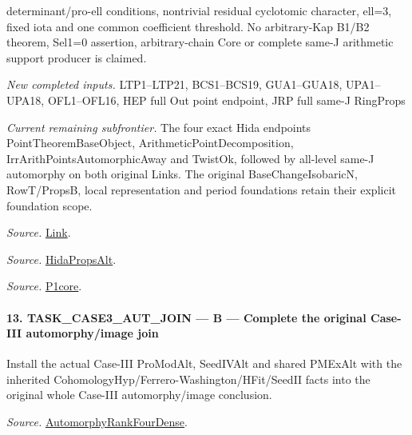 determinant/pro-ell conditions, nontrivial residual cyclotomic character, ell=3, fixed iota and one common coefficient threshold. No arbitrary-Kap B1/B2 theorem, Sel1=0 assertion, arbitrary-chain Core or complete same-J arithmetic support producer is claimed.

\emph{New completed inputs.} LTP1–LTP21, BCS1–BCS19, GUA1–GUA18, UPA1–UPA18, OFL1–OFL16, HEP full Out point endpoint, JRP full same-J RingProps

\emph{Current remaining subfrontier.} The four exact Hida endpoints PointTheoremBaseObject, ArithmeticPointDecomposition, IrrArithPointsAutomorphicAway and TwistOk, followed by all-level same-J automorphy on both original Links. The original BaseChangeIsobaricN, RowT/PropsB, local representation and period foundations retain their explicit foundation scope.

\emph{Source.} \href{https://github.com/CocoSgt/riemann-hypothesis-lean/blob/7cbf7a0c32fca1badf05931879a37c3f8a2b03b4/src/Development/AutomorphicArithmetic/AutomorphicVarieties/WeakShimuraTheory/IsAlgClosureField.lean#L19-L52}{Link}.

\emph{Source.} \href{https://github.com/CocoSgt/riemann-hypothesis-lean/blob/7cbf7a0c32fca1badf05931879a37c3f8a2b03b4/src/Development/AutomorphicArithmetic/AutomorphicVarieties/ModularityArgument/ThresholdArguments/DenseThresholdCases/PointTheoremBaseObject.lean#L32-L38}{HidaPropsAlt}.

\emph{Source.} \href{https://github.com/CocoSgt/riemann-hypothesis-lean/blob/7cbf7a0c32fca1badf05931879a37c3f8a2b03b4/src/Development/AutomorphicArithmetic/AutomorphicVarieties/WeilGroupCharacters/UniversalOrdinaryDeterminantRing.lean#L284-L286}{P1core}.



\paragraph{13. TASK\_\allowbreak CASE3\_\allowbreak AUT\_\allowbreak JOIN — B — Complete the original Case-III automorphy/image join}

Install the actual Case-III ProModAlt, SeedIVAlt and shared PMExAlt with the inherited CohomologyHyp/Ferrero-Washington/HFit/SeedII facts into the original whole Case-III automorphy/image conclusion.

\emph{Source.} \href{https://github.com/CocoSgt/riemann-hypothesis-lean/blob/7cbf7a0c32fca1badf05931879a37c3f8a2b03b4/src/Development/AutomorphicArithmetic/AutomorphicVarieties/ModularityArgument/ThresholdArguments/DenseThresholdCases/PromodularityCaseThree.lean#L43-L44}{AutomorphyRankFourDense}.

